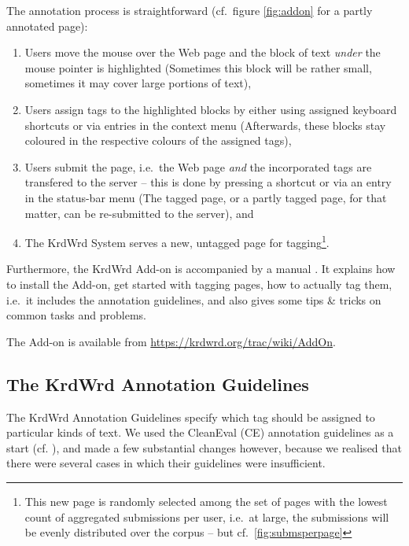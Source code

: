 \begin{longversion}
The annotation process is straightforward (cf.~figure \ref{fig:addon} for a partly annotated page): 
\begin{enumerate}
\item Users move the mouse over the Web page and the block of text \emph{under} the mouse pointer is highlighted
(Sometimes this block will be rather small, sometimes it may cover large portions of text),
\item Users assign tags to the highlighted blocks by either using assigned keyboard shortcuts or via entries in the context menu (Afterwards, these blocks stay coloured in the respective colours of the assigned tags),
\item Users submit the page, i.e.~the Web page \emph{and} the incorporated tags are transfered to the server -- this is done by pressing a shortcut or via an entry in the status-bar menu  
(The tagged page, or a partly tagged page, for that matter, can be re-submitted to the server), and
\item The KrdWrd System serves a new, untagged page for tagging\footnote{This new page is randomly selected among the set of pages with the lowest count of aggregated submissions per user, i.e.~at large, the submissions will be evenly distributed over the corpus -- but cf.~\ref{fig:submsperpage}}.
\end{enumerate}

Furthermore, the KrdWrd Add-on is accompanied by a manual \cite{krdwrd.org/manual}.
It explains how to install the Add-on, get started with tagging pages, how to actually tag them, i.e.~it includes the annotation guidelines, and also gives some tips \& tricks on common tasks and problems.

\noindent \linebreak
The Add-on is available from \url{https://krdwrd.org/trac/wiki/AddOn}.


\subsection{\label{sec:guidelines}The KrdWrd Annotation Guidelines}
The KrdWrd Annotation Guidelines specify which tag should be assigned to particular kinds of text. 
We used the CleanEval (CE) annotation guidelines as a start (cf. \cite{cleaneval/annotation_guidelines}), and made a few substantial changes however, because we realised that there were several cases in which their guidelines were insufficient.


\end{longversion}

